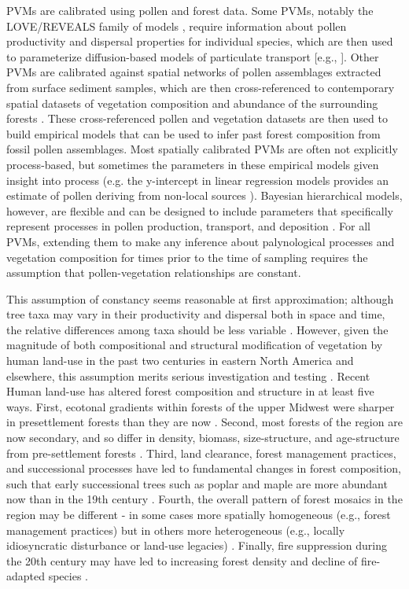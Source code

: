 \documentclass[12pt]{article}
\begin{document}
PVMs are calibrated using pollen and forest data. Some PVMs, notably
the LOVE/REVEALS family of models \citep{sugita2007theory1,
  sugita2007theory2}, require information about pollen productivity
and dispersal properties for individual species, which are then used
to parameterize diffusion-based models of particulate transport [e.g.,
\citet{prentice1985pollen}]. Other PVMs are calibrated against spatial
networks of pollen assemblages extracted from surface sediment
samples, which are then cross-referenced to contemporary spatial
datasets of vegetation composition and abundance of the surrounding
forests \citep{sugita2007theory1, sugita2007theory2}. These
cross-referenced pollen and vegetation datasets are then used to build
empirical models that can be used to infer past forest composition
from fossil pollen assemblages. Most spatially calibrated PVMs are
often not explicitly process-based, but sometimes the parameters in
these empirical models given insight into process (e.g. the
y-intercept in linear regression models provides an estimate of pollen
deriving from non-local sources \citep{howe1983calibrating}).
Bayesian hierarchical models, however, are flexible and can be
designed to include parameters that specifically represent processes
in pollen production, transport, and deposition
\citep{paciorek2009mapping}.  For all PVMs, extending them to make any
inference about palynological processes and vegetation composition for
times prior to the time of sampling requires the assumption that
pollen-vegetation relationships are constant.

This assumption of constancy seems reasonable at first approximation;
although tree taxa may vary in their productivity and dispersal both
in space and time, the relative differences among taxa should be less
variable \citep{parsons1981statistical}.  However, given the magnitude
of both compositional and structural modification of vegetation by
human land-use in the past two centuries in eastern North America and
elsewhere, this assumption merits serious investigation and testing
\citep{kujawa2015}. Recent Human land-use has altered forest
composition and structure in at least five ways.  First, ecotonal
gradients within forests of the upper Midwest were sharper in
presettlement forests than they are now
\citep{goring_witness}. Second, most forests of the region are now
secondary, and so differ in density, biomass, size-structure, and
age-structure from pre-settlement forests
\citep{rhemtulla2009legacies}.  Third, land clearance, forest
management practices, and successional processes have led to
fundamental changes in forest composition, such that early
successional trees such as poplar and maple are more abundant now than
in the 19th century \citep{thompson2013four}.  Fourth, the overall
pattern of forest mosaics in the region may be different - in some
cases more spatially homogeneous (e.g., forest management practices)
but in others more heterogeneous (e.g., locally idiosyncratic
disturbance or land-use legacies) \citep{thompson2013four,
  wang2007spatial}. Finally, fire suppression during the 20th century
may have led to increasing forest density and decline of fire-adapted
species \citep{nowacki2008demise}.
\end{document}
